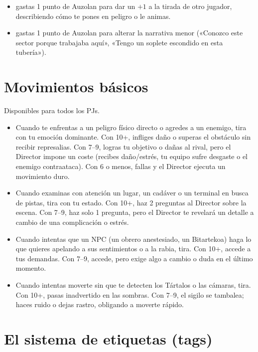 \begin{itemize}
  \item {} gastas 1 punto de Auzolan para dar un $+1$ a la tirada de otro jugador, describiendo cómo te pones en peligro o le animas.
  \item {} gastas 1 punto de Auzolan para alterar la narrativa menor («Conozco este sector porque trabajaba aquí», «Tengo un soplete escondido en esta tubería»).
\end{itemize}

\section{Movimientos básicos}

Disponibles para todos los PJs.

\begin{itemize}
  \item {} Cuando te enfrentas a un peligro físico directo o agredes a un enemigo, tira con tu emoción dominante. Con 10+, infliges daño o superas el obstáculo sin recibir represalias. Con 7--9, logras tu objetivo o dañas al rival, pero el Director impone un coste (recibes daño/estrés, tu equipo sufre desgaste o el enemigo contraataca). Con 6 o menos, fallas y el Director ejecuta un movimiento duro.
  \item {} Cuando examinas con atención un lugar, un cadáver o un terminal en busca de pistas, tira con tu estado. Con 10+, haz 2 preguntas al Director sobre la escena. Con 7--9, haz solo 1 pregunta, pero el Director te revelará un detalle a cambio de una complicación o estrés.
  \item {} Cuando intentas que un NPC (un obrero anestesiado, un Bitartekoa) haga lo que quieres apelando a sus sentimientos o a la rabia, tira. Con 10+, accede a tus demandas. Con 7--9, accede, pero exige algo a cambio o duda en el último momento.
  \item {} Cuando intentas moverte sin que te detecten los Tártalos o las cámaras, tira. Con 10+, pasas inadvertido en las sombras. Con 7--9, el sigilo se tambalea; haces ruido o dejas rastro, obligando a moverte rápido.
\end{itemize}

\section{El sistema de etiquetas (tags)}


